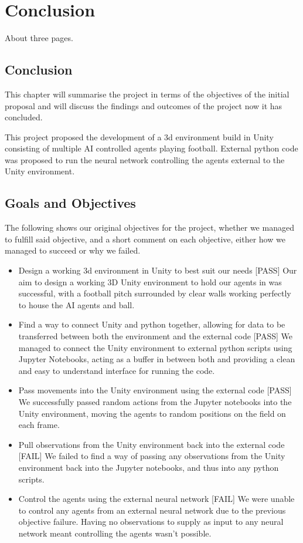 
\chapter{Conclusion}
About three pages.

\section{Conclusion}
This chapter will summarise the project in terms of the objectives of the initial proposal and will discuss the findings and outcomes of the project now it has concluded.

This project proposed the development of a 3d environment build in Unity consisting of multiple AI controlled agents playing football. External python code was proposed to run the neural network controlling the agents external to the Unity environment. 

\section{Goals and Objectives}

The following shows our original objectives for the project, whether we managed to fulfill said objective, and a short comment on each objective, either how we managed to succeed or why we failed.

\begin{itemize}
    \item{Design a working 3d environment in Unity to best suit our needs
[PASS]
Our aim to design a working 3D Unity environment to hold our agents in was successful, with a football pitch surrounded by clear walls working perfectly to house the AI agents and ball.}

    \item{Find a way to connect Unity and python together, allowing for data to be transferred between both the environment and the external code
[PASS]
We managed to connect the Unity environment to external python scripts using Jupyter Notebooks, acting as a buffer in between both and providing a clean and easy to understand interface for running the code.}

    \item{Pass movements into the Unity environment using the external code
[PASS]
We successfully passed random actions from the Jupyter notebooks into the Unity environment, moving the agents to random positions on the field on each frame.}

    \item{Pull observations from the Unity environment back into the external code
[FAIL]
We failed to find a way of passing any observations from the Unity environment back into the Jupyter notebooks, and thus into any python scripts.}

    \item{Control the agents using the external neural network
[FAIL]
We were unable to control any agents from an external neural network due to the previous objective failure. Having no observations to supply as input to any neural network meant controlling the agents wasn't possible.}
\end{itemize}

